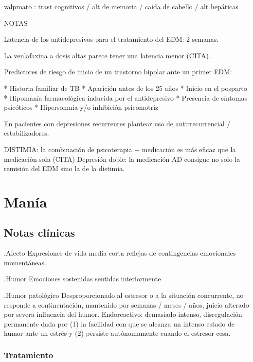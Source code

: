 \documentclass{scrbook}
\begin{document}
valproato : trast cognitivos / alt de memoria / caída de cabello / alt hepáticas

NOTAS

Latencia de los antidepresivos para el tratamiento del EDM: 2 semanas.

La venlafaxina a dosis altas parece tener una latencia menor (CITA).

Predictores de riesgo de inicio de un trastorno bipolar ante un primer EDM:

* Historia familiar de TB
* Aparición antes de los 25 años
* Inicio en el posparto
* Hipomanía farmacológica inducida por el antidepresivo
* Presencia de síntomas psicóticos
* Hipersomnia y/o inhibición psicomotriz

En pacientes con depresiones recurrentes plantear uso de antirrecurrencial / estabilizadores.

DISTIMIA: la combinación de psicoterapia + medicación es más eficaz que la medicación sola (CITA)
Depresión doble: la medicación AD consigue no solo la remisión del EDM sino la de la distimia.

\chapter{Manía}
\section*{Notas clínicas}

.Afecto
Expresiones de vida media corta reflejas de contingencias emocionales momentáneas.

.Humor
Emociones sostenidas sentidas interiormente

.Humor patológico
Desproporcionado al estresor o a la situación concurrente, no responde a continentación, mantenido por semanas / meses / años, juicio alterado por severa influencia del humor. Endoreactivo: demasiado intenso, disregulación permanente dada por (1) la facilidad con que se alcanza un intenso estado de humor ante un estrés y (2) persiste autónomamente cuando el estresor cesa.

\subsection*{Tratamiento}
\end{document}
